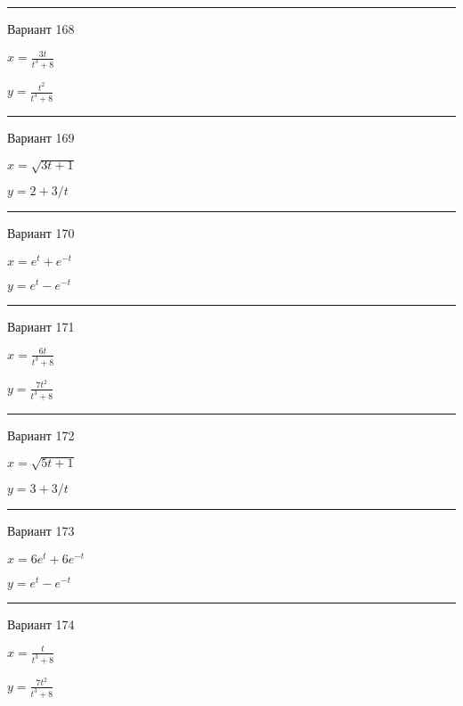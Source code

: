 \documentclass[11pt]{report}
\begin{document}
\rule{\textwidth}{.2mm}

 Вариант 168

$x = \frac{3 t}{t^{3} + 8}$

$y = \frac{t^{2}}{t^{3} + 8}$

\rule{\textwidth}{.2mm}

 Вариант 169

$x = \sqrt{3 t + 1}$

$y = 2 + 3 / t$

\rule{\textwidth}{.2mm}

 Вариант 170

$x = e^{t} + e^{- t}$

$y = e^{t} - e^{- t}$

\rule{\textwidth}{.2mm}

 Вариант 171

$x = \frac{6 t}{t^{3} + 8}$

$y = \frac{7 t^{2}}{t^{3} + 8}$

\rule{\textwidth}{.2mm}

 Вариант 172

$x = \sqrt{5 t + 1}$

$y = 3 + 3 / t$

\rule{\textwidth}{.2mm}

 Вариант 173

$x = 6 e^{t} + 6 e^{- t}$

$y = e^{t} - e^{- t}$

\rule{\textwidth}{.2mm}

 Вариант 174

$x = \frac{t}{t^{3} + 8}$

$y = \frac{7 t^{2}}{t^{3} + 8}$
\end{document}
